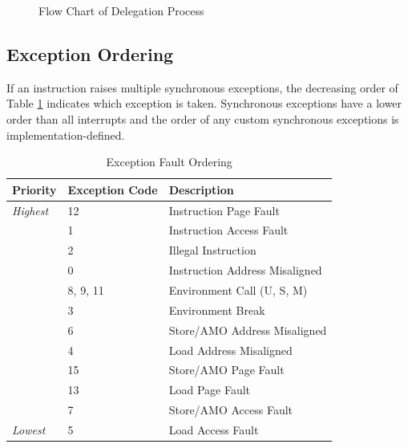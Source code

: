 \documentclass[12pt]{article}
\begin{document}
\begin{figure}[h!]
\centering
{}
\caption{Flow Chart of Delegation Process}
\label{delegation}
\end{figure}

\subsection{Exception Ordering}
If an instruction raises multiple synchronous exceptions, the decreasing order of Table \ref{exceptionpriorities} indicates which exception is taken. Synchronous exceptions have a lower order than all interrupts and the order of any custom synchronous exceptions is implementation-defined. 

\begin{table}[h!]
\centering
\begin{tabular}{| l | l | l |}
\hline
Priority & Exception Code & Description \\
\hline
\emph{Highest} & 12 & Instruction Page Fault \\
\hline
& 1 & Instruction Access Fault \\
\hline
& 2 & Illegal Instruction \\ 
\hline
& 0 & Instruction Address Misaligned \\ 
\hline
& 8, 9, 11 & Environment Call (U, S, M) \\
\hline
& 3 & Environment Break \\ 
\hline
& 6 & Store/AMO Address Misaligned \\ 
\hline
& 4 & Load Address Misaligned \\ 
\hline
& 15 & Store/AMO Page Fault \\
\hline
& 13 & Load Page Fault \\
\hline
& 7 & Store/AMO Access Fault \\
\hline
\emph{Lowest} & 5 & Load Access Fault \\ 
\hline
\end{tabular}
\caption{Exception Fault Ordering}
\label{exceptionpriorities}
\end{table}
\end{document}
